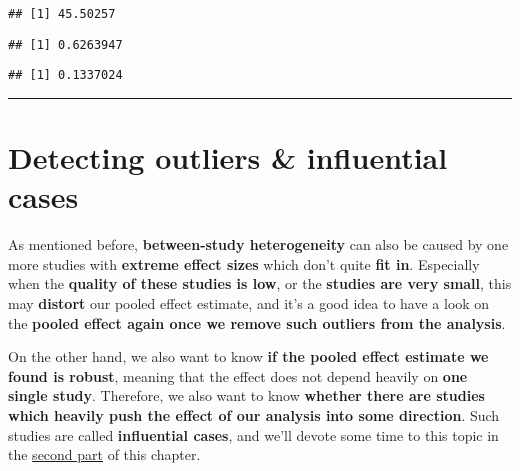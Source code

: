 \documentclass[]{book}
\newenvironment{Shaded}{\begin{snugshade}}{\end{snugshade}}
\newcommand{\DecValTok}[1]{\textcolor[rgb]{0.00,0.00,0.81}{#1}}
\newcommand{\OperatorTok}[1]{\textcolor[rgb]{0.81,0.36,0.00}{\textbf{#1}}}
\newcommand{\NormalTok}[1]{#1}
\theoremstyle{definition}
\theoremstyle{definition}
\theoremstyle{definition}
\theoremstyle{remark}
\begin{document}
\begin{verbatim}
## [1] 45.50257
\end{verbatim}

\begin{Shaded}
\end{Shaded}

\begin{verbatim}
## [1] 0.6263947
\end{verbatim}

\begin{Shaded}
\end{Shaded}

\begin{verbatim}
## [1] 0.1337024
\end{verbatim}

\begin{center}\rule{0.5\linewidth}{\linethickness}\end{center}

\section{Detecting outliers \& influential
cases}\label{detecting-outliers-influential-cases}

As mentioned before, \textbf{between-study heterogeneity} can also be
caused by one more studies with \textbf{extreme effect sizes} which
don't quite \textbf{fit in}. Especially when the \textbf{quality of
these studies is low}, or the \textbf{studies are very small}, this may
\textbf{distort} our pooled effect estimate, and it's a good idea to
have a look on the \textbf{pooled effect again once we remove such
outliers from the analysis}.

On the other hand, we also want to know \textbf{if the pooled effect
estimate we found is robust}, meaning that the effect does not depend
heavily on \textbf{one single study}. Therefore, we also want to know
\textbf{whether there are studies which heavily push the effect of our
analysis into some direction}. Such studies are called
\textbf{influential cases}, and we'll devote some time to this topic in
the \protect\hyperlink{influenceanalyses}{second part} of this chapter.
\end{document}
